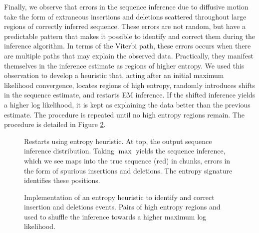 \documentclass{biophys_letter}
\begin{document}
Finally, we observe that errors in the sequence inference due to diffusive motion take the form of extraneous insertions and deletions scattered throughout large regions of correctly inferred sequence.
These errors are not random, but have a predictable pattern that makes it possible to identify and correct them during the inference algorithm.
In terms of the Viterbi path, these errors occurs when there are multiple paths that may explain the observed data. 
Practically, they manifest themselves in the inference estimate as regions of higher entropy.
We used this observation to develop a heuristic that, acting after an initial maximum likelihood convergence, locates regions of high entropy, randomly introduces shifts in the sequence estimate, and restarts EM inference.
If the shifted inference yields a higher log likelihood, it is kept as explaining the data better than the previous estimate.
The procedure is repeated until no high entropy regions remain.
The procedure is detailed in Figure \ref{fig:entropy_restarts}.

\begin{figure}
  \caption{Restarts using entropy heuristic. At top, the output sequence inference distribution. Taking $\max$ yields the sequence inference, which we see maps into the true sequence (red) in chunks, errors in the form of spurious insertions and deletions. The entropy signature identifies these positions.}
\label{fig:inference_output}
\end{figure}

\begin{figure}
\caption{Implementation of an entropy heuristic to identify and correct insertion and deletions events. Pairs of high entropy regions and used to shuffle the inference towards a higher maximum log likelihood.}
\label{fig:entropy_restarts}
\end{figure}
\end{document}

